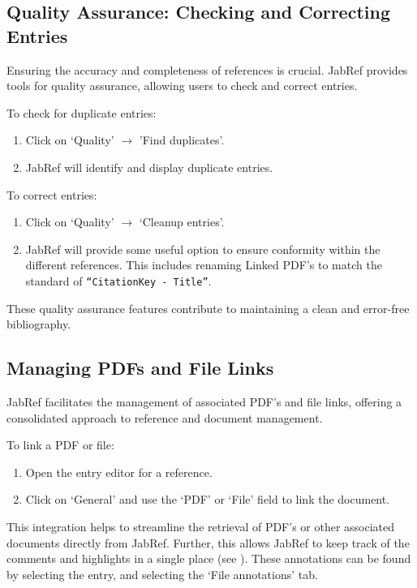 		\subsection{Quality Assurance: Checking and Correcting Entries}
			Ensuring the accuracy and completeness of references is crucial. 
			JabRef provides tools for quality assurance, allowing users to check and correct entries.

			To check for duplicate entries:
			\begin{enumerate}
				\item Click on `Quality' \(\rightarrow\) 'Find duplicates'.
				\item JabRef will identify and display duplicate entries.
			\end{enumerate}
			
			To correct entries:
			\begin{enumerate}
				\item Click on `Quality' \(\rightarrow\) `Cleanup entries'.
				\item JabRef will provide some useful option to ensure conformity within the different references.
					This includes renaming Linked PDF's to match the standard of \texttt{``CitationKey - Title''}.
			\end{enumerate}
						
			These quality assurance features contribute to maintaining a clean and error-free bibliography.

		\subsection{Managing PDFs and File Links}
			JabRef facilitates the management of associated PDF's and file links, offering a consolidated approach to reference and document management.

			To link a PDF or file:
			\begin{enumerate}
				\item Open the entry editor for a reference.
				\item Click on `General' and use the `PDF' or `File' field to link the document.
			\end{enumerate}
			This integration helps to streamline the retrieval of PDF's or other associated documents directly from JabRef.
			Further, this allows JabRef to keep track of the comments and highlights in a single place (see ).
			These annotations can be found by selecting the entry, and selecting the `File annotations' tab.


